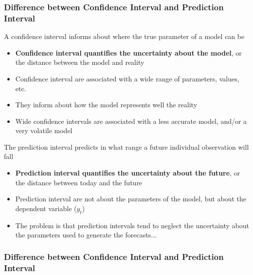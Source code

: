 \documentclass{beamer}
\newenvironment{wideitemize}{\itemize\addtolength{\itemsep}{10pt}}{\enditemize}
\begin{document}
\begin{frame}
  \frametitle{Difference between Confidence Interval and Prediction Interval}
  \begin{wideitemize}


 \item A confidence interval informs about where the true parameter of a model can be
   \begin{itemize}
     \item \textbf{Confidence interval quantifies the uncertainty about the model}, or the distance between the model and reality
     \item Confidence interval are associated with a wide range of parameters, values, etc.
     \item They inform about how the model represents well the reality
     \item Wide confidence intervals are associated with a less accurate model, and/or a very volatile model
   \end{itemize}

    
  \item The prediction interval predicts in what range a future individual observation will fall
    \begin{itemize}
      \item \textbf{Prediction interval quantifies the uncertainty about the future}, or the distance between today and the future
      \item Prediction interval are not about the parameters of the model, but about the dependent variable ($y_t$)
      \item The problem is that prediction intervals tend to neglect the uncertainty about the parameters used to generate the forecasts...
    \end{itemize}   
  \end{wideitemize}
  
\end{frame}


\begin{frame}
  \frametitle{Difference between Confidence Interval and Prediction Interval}
\end{frame}
\end{document}
